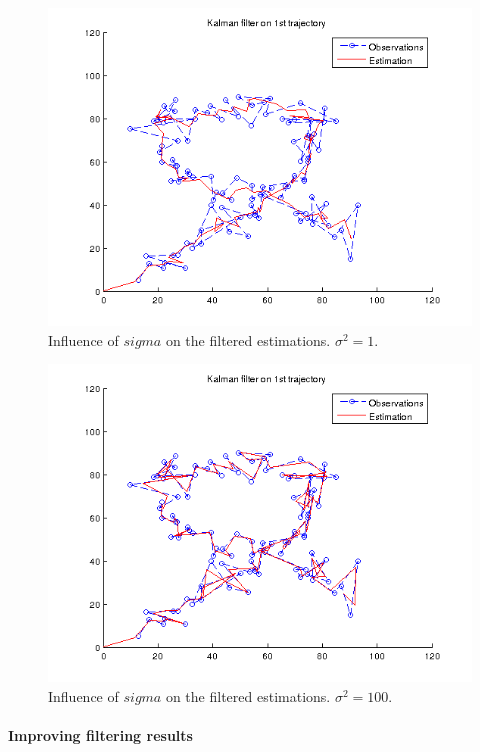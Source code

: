 \documentclass[a4paper, 12pt, titlepage]{article}
\begin{document}
\begin{figure}
	\includegraphics[width=15cm]{images/sigma1.png}
	\caption{Influence of $sigma$ on the filtered estimations. $\sigma^2=1$.}
	\label{fig:5}
\end{figure}

\begin{figure}
	\includegraphics[width=15cm]{images/sigma10.png}
	\caption{Influence of $sigma$ on the filtered estimations. $\sigma^2=100$.}
	\label{fig:6}
\end{figure}

\paragraph{Improving filtering results}
\end{document}
